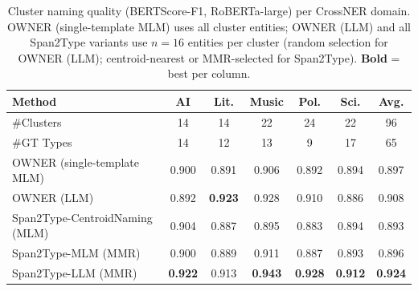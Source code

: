 \begin{table}[t]
\centering
\footnotesize
\caption{Cluster naming quality (BERTScore-F1, RoBERTa-large) per CrossNER domain.
OWNER (single-template MLM) uses all cluster entities; OWNER (LLM) and all Span2Type variants use $n{=}16$ entities per cluster (random selection for OWNER (LLM); centroid-nearest or MMR-selected for Span2Type).
\textbf{Bold} = best per column.}
\label{tab:naming}
\begin{tabular}{l|ccccc|c}
\toprule
Method & AI & Lit. & Music & Pol. & Sci. & Avg. \\
\midrule
\#Clusters  & 14 & 14 & 22 & 24 & 22 & 96 \\
\#GT Types  & 14 & 12 & 13 &  9 & 17 & 65 \\
\midrule
OWNER (single-template MLM)
  & 0.900 & 0.891 & 0.906 & 0.892 & 0.894 & 0.897 \\
OWNER (LLM)
  & 0.892 & \textbf{0.923} & 0.928 & 0.910 & 0.886 & 0.908 \\
Span2Type-CentroidNaming (MLM)
  & 0.904 & 0.887 & 0.895 & 0.883 & 0.894 & 0.893 \\
Span2Type-MLM (MMR)
  & 0.900 & 0.889 & 0.911 & 0.887 & 0.893 & 0.896 \\
Span2Type-LLM (MMR)
  & \textbf{0.922} & 0.913 & \textbf{0.943} & \textbf{0.928} & \textbf{0.912} & \textbf{0.924} \\
\bottomrule
\end{tabular}
\end{table}

